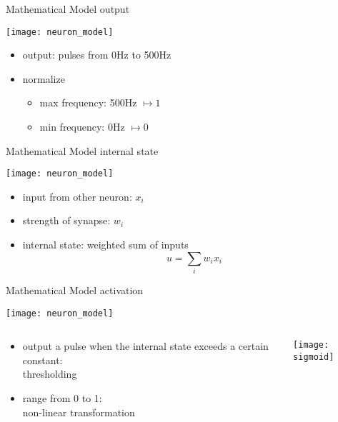 \documentclass[fleqn,aspectratio=1610]{beamer}
\begin{document}
\begin{frame}[label={sec:orgaf53fcc},t]{Mathematical Model}
output
\begin{center}
\texttt{[image: neuron\_model]}
\end{center}
\begin{itemize}
\item output: pulses from 0Hz to 500Hz
\item normalize
\begin{itemize}
\item max frequency: 500Hz \(\mapsto1\)
\item min frequency: 0Hz \(\mapsto0\)
\end{itemize}
\end{itemize}
\end{frame}

\begin{frame}[label={sec:org5823c56},t]{Mathematical Model}
internal state
\begin{center}
\texttt{[image: neuron\_model]}
\end{center}
\begin{itemize}
\item input from other neuron: \(x_i\)
\item strength of synapse: \(w_i\)
\item internal state: \alert{weighted sum of inputs}
\begin{equation}
  u=\sum_{i} w_i x_i
\end{equation}
\end{itemize}
\end{frame}

\begin{frame}[label={sec:org1fd6b73},t]{Mathematical Model}
activation
\begin{center}
\texttt{[image: neuron\_model]}
\end{center}
\begin{columns}
\begin{column}{0.7\columnwidth}
\begin{itemize}
\item output a pulse when the internal state exceeds a certain constant:\\[0pt]
\alert{thresholding}
\item range from 0 to 1:\\[0pt]
\alert{non-linear transformation}
\end{itemize}
\end{column}
\begin{column}{0.3\columnwidth}
\begin{center}
\texttt{[image: sigmoid]}
\end{center}
\end{column}
\end{columns}
\end{frame}
\end{document}
